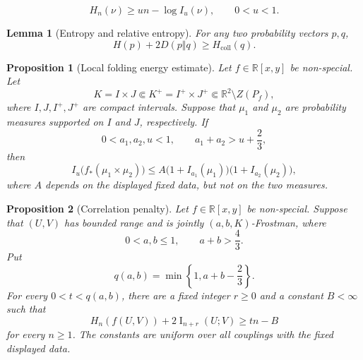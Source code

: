 \documentclass[10pt,a4paper]{amsart}
\newtheorem{lemma}{Lemma}
\newtheorem{proposition}{Proposition}
\begin{document}
\begin{equation}
 H_n(\nu)\geq u n-\log I_u(\nu),\qquad 0<u<1.
 \label{eq_pham_energy_entropy}
\end{equation}

\begin{lemma}[Entropy and relative entropy]
\label{lem_pham_relative_entropy}
For any two probability vectors $p,q$,
\begin{equation}
 H(p)+2D(p\Vert q)\geq H_{\mathrm{coll}}(q).
 \label{eq_pham_relative_entropy}
\end{equation}
\end{lemma}

\begin{proposition}[Local folding energy estimate]
\label{prop_pham_local_energy}
Let $f\in\mathbb R[x,y]$ be non-special.  Let
\[
 K=I\times J\Subset K^+=I^+\times J^+
 \Subset\mathbb R^2\setminus Z(P_f),
\]
where $I,J,I^+,J^+$ are compact intervals.  Suppose that $\mu_1$ and
$\mu_2$ are probability measures supported on $I$ and $J$,
respectively.  If
\[
 0<a_1,a_2,u<1,
 \qquad a_1+a_2>u+\frac{2}{3},
\]
then
\begin{equation}
 I_u\big(f_*(\mu_1\times\mu_2)\big)
 \leq A
 \bigl(1+I_{a_1}(\mu_1)\bigr)
 \bigl(1+I_{a_2}(\mu_2)\bigr),
 \label{eq_pham_local_energy}
\end{equation}
where $A$ depends on the displayed fixed data, but not on the two
measures.
\end{proposition}

\begin{proposition}[Correlation penalty]
\label{prop_pham_correlation}
Let $f\in\mathbb R[x,y]$ be non-special.  Suppose that $(U,V)$ has
bounded range and is jointly $(a,b,K)$-Frostman, where
\[
 0<a,b\leq1,\qquad a+b>\frac{4}{3}.
\]
Put
\begin{equation}
 q(a,b)=\min\left\{1,a+b-\frac{2}{3}\right\}.
 \label{eq_pham_q_ab}
\end{equation}
For every $0<t<q(a,b)$, there are a fixed integer $r\geq0$ and a
constant $B<\infty$ such that
\begin{equation}
 H_n(f(U,V))+2\operatorname{I}_{n+r}(U;V)\geq t n-B
 \label{eq_pham_correlation}
\end{equation}
for every $n\geq1$.  The constants are uniform over all couplings
with the fixed displayed data.
\end{proposition}
\end{document}
